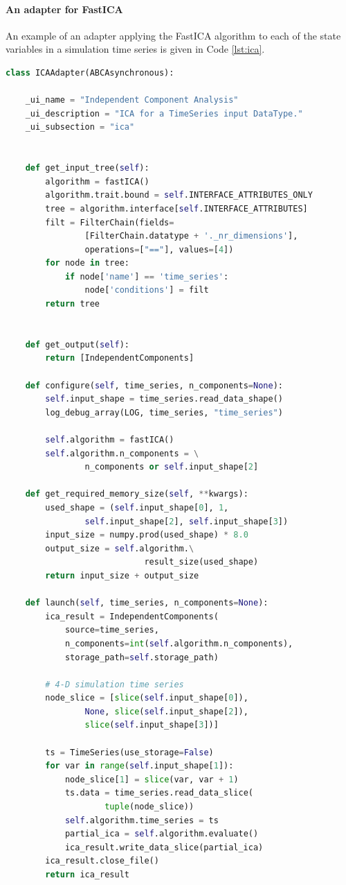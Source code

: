 \documentclass{bioinfo}
\begin{document}
\paragraph{An adapter for FastICA}

An example of an adapter applying the FastICA algorithm to each of the 
state variables in a simulation time series is given in Code \ref{lst:ica}.

\begin{lstlisting}[language=Python]
class ICAAdapter(ABCAsynchronous):
    
    _ui_name = "Independent Component Analysis"
    _ui_description = "ICA for a TimeSeries input DataType."
    _ui_subsection = "ica"
    
    
    def get_input_tree(self):
        algorithm = fastICA()
        algorithm.trait.bound = self.INTERFACE_ATTRIBUTES_ONLY
        tree = algorithm.interface[self.INTERFACE_ATTRIBUTES]
        filt = FilterChain(fields=
                [FilterChain.datatype + '._nr_dimensions'],
                operations=["=="], values=[4])
        for node in tree:
            if node['name'] == 'time_series':
                node['conditions'] = filt
        return tree
    
    
    def get_output(self):
        return [IndependentComponents]
    
    def configure(self, time_series, n_components=None):
        self.input_shape = time_series.read_data_shape()
        log_debug_array(LOG, time_series, "time_series")
        
        self.algorithm = fastICA()
        self.algorithm.n_components = \
                n_components or self.input_shape[2]
        
    def get_required_memory_size(self, **kwargs):
        used_shape = (self.input_shape[0], 1, 
                self.input_shape[2], self.input_shape[3])
        input_size = numpy.prod(used_shape) * 8.0
        output_size = self.algorithm.\
                            result_size(used_shape)
        return input_size + output_size  
    
    def launch(self, time_series, n_components=None):
        ica_result = IndependentComponents(
            source=time_series,
            n_components=int(self.algorithm.n_components),
            storage_path=self.storage_path)
        
        # 4-D simulation time series
        node_slice = [slice(self.input_shape[0]), 
                None, slice(self.input_shape[2]), 
                slice(self.input_shape[3])]
        
        ts = TimeSeries(use_storage=False)
        for var in range(self.input_shape[1]):
            node_slice[1] = slice(var, var + 1)
            ts.data = time_series.read_data_slice(
                    tuple(node_slice))
            self.algorithm.time_series = ts 
            partial_ica = self.algorithm.evaluate()
            ica_result.write_data_slice(partial_ica)
        ica_result.close_file()
        return ica_result
\end{lstlisting}
\end{document}
